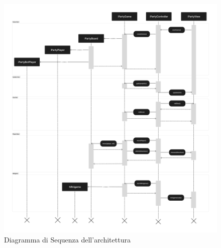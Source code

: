 \begin{figure}[ht!]
    \centering
    \includegraphics[width=1\textwidth]{figures/sequence-diagram.png}
    \caption{Diagramma di Sequenza dell'architettura}
    \label{fig:sequence-diagram}
\end{figure}